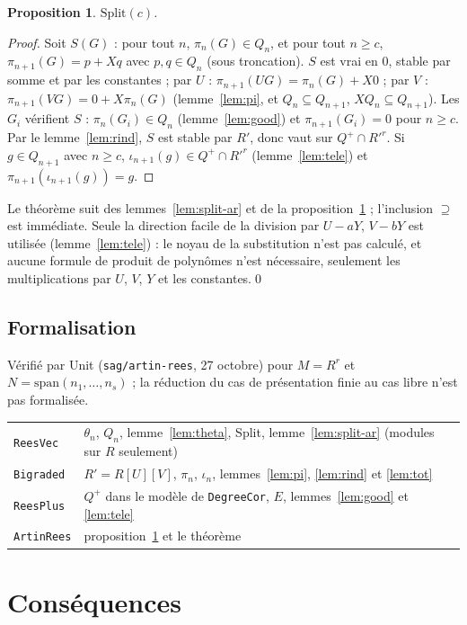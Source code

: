 \documentclass[11pt]{amsart}
\newtheorem{proposition}[theorem]{Proposition}
\theoremstyle{definition}
\theoremstyle{remark}
\newcommand{\sm}{\mathrm{span}}
\begin{document}
\begin{proposition}\label{prop:split}
$\mathrm{Split}(c)$.
\end{proposition}

\begin{proof}
Soit $S(G)$ : pour tout $n$, $\pi_n(G)\in Q_n$, et pour tout $n\ge c$,
$\pi_{n+1}(G)=p+Xq$ avec $p,q\in Q_n$ (sous troncation). $S$ est vrai en
$0$, stable par somme et par les constantes ; par $U$ :
$\pi_{n+1}(UG)=\pi_n(G)+X0$ ; par $V$ : $\pi_{n+1}(VG)=0+X\pi_n(G)$
(lemme~\ref{lem:pi}, et $Q_n\subseteq Q_{n+1}$, $XQ_n\subseteq Q_{n+1}$).
Les $G_i$ vérifient $S$ : $\pi_n(G_i)\in Q_n$ (lemme~\ref{lem:good}) et
$\pi_{n+1}(G_i)=0$ pour $n\ge c$. Par le lemme~\ref{lem:rind}, $S$ est
stable par $R'$, donc vaut sur $Q^+\cap R'^r$. Si $g\in Q_{n+1}$ avec $n\ge c$, $\iota_{n+1}(g)\in Q^+\cap R'^r$
(lemme~\ref{lem:tele}) et $\pi_{n+1}(\iota_{n+1}(g))=g$.
\end{proof}

Le théorème suit des lemmes~\ref{lem:split-ar} et de la
proposition~\ref{prop:split} ; l'inclusion $\supseteq$ est immédiate.
Seule la direction facile de la division par $U-aY$, $V-bY$ est utilisée
(lemme~\ref{lem:tele}) : le noyau de la substitution n'est pas calculé,
et aucune formule de produit de polynômes n'est nécessaire, seulement
les multiplications par $U$, $V$, $Y$ et les constantes.\qed

\subsection{Formalisation}
Vérifié par Unit (\texttt{sag/artin-rees}, 27 octobre) pour $M=R^r$ et
$N=\sm(n_1,\dots,n_s)$ ; la réduction du cas de présentation finie au cas
libre n'est pas formalisée.

\begin{tabular}{ll}
\texttt{ReesVec} & $\theta_n$, $Q_n$, lemme~\ref{lem:theta}, Split,
  lemme~\ref{lem:split-ar} (modules sur $R$ seulement)\\
\texttt{Bigraded} & $R'=R[U][V]$, $\pi_n$, $\iota_n$,
  lemmes~\ref{lem:pi}, \ref{lem:rind} et \ref{lem:tot}\\
\texttt{ReesPlus} & $Q^+$ dans le modèle de \texttt{DegreeCor}, $E$,
  lemmes~\ref{lem:good} et \ref{lem:tele}\\
\texttt{ArtinRees} & proposition~\ref{prop:split} et le théorème
\end{tabular}

\section{Conséquences}\label{sec:cons}
\end{document}
